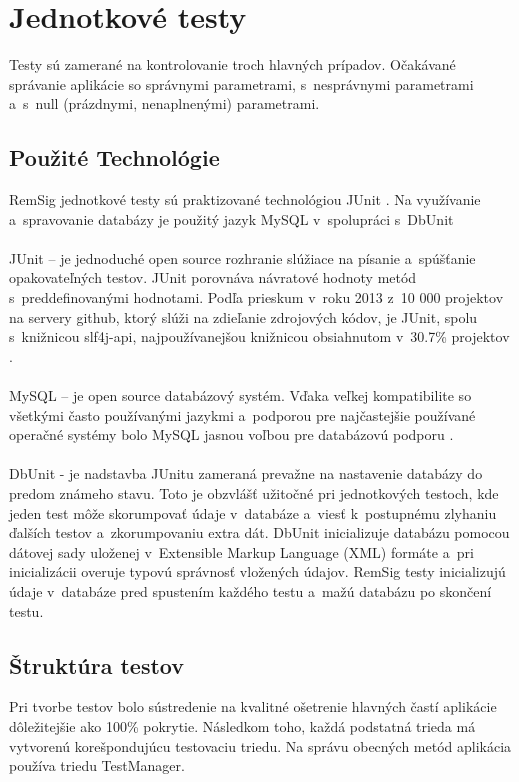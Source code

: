 \documentclass[
  digital, %
  table,   %
oneside,
  nolof,     %
  nolot,     %
]{fithesis3}
\begin{document}
\section{Jednotkové testy}
Testy sú zamerané na kontrolovanie troch hlavných prípadov. Očakávané správanie aplikácie so správnymi parametrami, s~nesprávnymi parametrami a~s~null (prázdnymi, nenaplnenými) parametrami.
\subsection{Použité Technológie}
RemSig jednotkové testy sú praktizované technológiou  JUnit \cite{junit}. Na využívanie a~spravovanie databázy je použitý jazyk MySQL v~spolupráci s~DbUnit \cite{dbunit}\paragraph{}
JUnit – je jednoduché open source rozhranie slúžiace na písanie a~spúšťanie opakovateľných testov. JUnit porovnáva návratové hodnoty metód s~preddefinovanými hodnotami. Podľa prieskum v~roku 2013 z~10 000 projektov na servery github, ktorý slúži na zdieľanie zdrojových kódov, je JUnit, spolu s~knižnicou slf4j-api, najpoužívanejšou knižnicou obsiahnutom v~30.7\% projektov \cite{gitHubAnalysis}. \paragraph{}
MySQL – je open source databázový systém. Vďaka veľkej kompatibilite so všetkými často používanými jazykmi a~podporou pre najčastejšie používané operačné systémy bolo MySQL jasnou voľbou pre databázovú podporu \cite{mySqlBible}.\paragraph{}
DbUnit -  je nadstavba JUnitu zameraná prevažne na nastavenie databázy do predom známeho stavu. Toto je obzvlášť užitočné pri jednotkových testoch, kde jeden test môže skorumpovať údaje v~databáze a~viesť k~postupnému zlyhaniu ďalších  testov a~zkorumpovaniu extra dát. DbUnit inicializuje databázu pomocou  dátovej sady uloženej v~Extensible Markup Language (XML) formáte a~pri inicializácii overuje typovú správnosť vložených údajov. RemSig testy inicializujú údaje v~databáze pred  spustením  každého testu a~mažú databázu po skončení testu.  

\subsection{Štruktúra testov}
Pri tvorbe testov bolo sústredenie na kvalitné ošetrenie hlavných častí aplikácie dôležitejšie ako 100\% pokrytie. Následkom toho, každá podstatná trieda má vytvorenú korešpondujúcu testovaciu triedu. Na správu obecných metód aplikácia používa triedu TestManager. 
\end{document}
